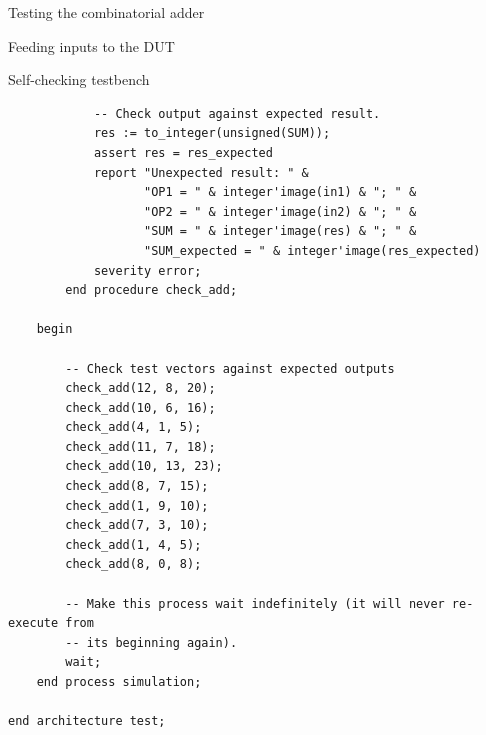 \documentclass[lab]{course}
\begin{document}
\begin{section}{Testing the combinatorial adder}
\begin{subsection}{Feeding inputs to the DUT}
\begin{subsubsection}{Self-checking testbench}
\begin{lstlisting}
            -- Check output against expected result.
            res := to_integer(unsigned(SUM));
            assert res = res_expected
            report "Unexpected result: " &
                   "OP1 = " & integer'image(in1) & "; " &
                   "OP2 = " & integer'image(in2) & "; " &
                   "SUM = " & integer'image(res) & "; " &
                   "SUM_expected = " & integer'image(res_expected)
            severity error;
        end procedure check_add;

    begin

        -- Check test vectors against expected outputs
        check_add(12, 8, 20);
        check_add(10, 6, 16);
        check_add(4, 1, 5);
        check_add(11, 7, 18);
        check_add(10, 13, 23);
        check_add(8, 7, 15);
        check_add(1, 9, 10);
        check_add(7, 3, 10);
        check_add(1, 4, 5);
        check_add(8, 0, 8);

        -- Make this process wait indefinitely (it will never re-execute from
        -- its beginning again).
        wait;
    end process simulation;

end architecture test;
            \end{lstlisting}
        \end{subsubsection}
    \end{subsection}
\end{section}

\clearpage
\end{document}
